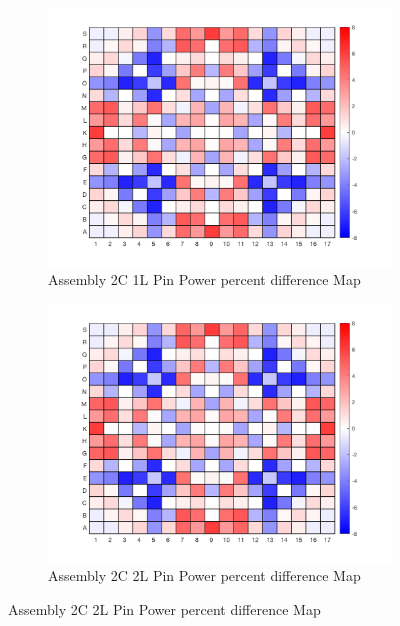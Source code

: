 \documentclass[12pt]{article}
\begin{document}
\begin{figure}[htb!]

        \begin{subfigure}{.5\textwidth} %
            \centering
            \includegraphics[scale=0.46]{Figures/2C_1L_pinpowerDiff.png} 
            \caption{Assembly 2C 1L Pin Power percent difference Map}
            \label{fig:sub-first}
        \end{subfigure}
        \begin{subfigure}{.5\textwidth}
            \centering
            \includegraphics[scale=0.46]{Figures/2C_2L_pinpowerDiff.png} 
            \caption{Assembly 2C 2L Pin Power percent difference Map}
            \label{fig:sub-second}
        \end{subfigure}


\end{figure}
\end{document}
